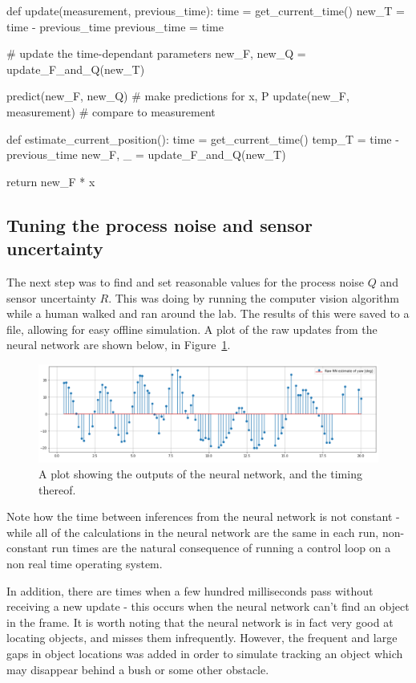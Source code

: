 \begin{python}
def update(measurement, previous_time):
	time = get_current_time()
	new_T = time - previous_time
	previous_time = time
	
	# update the time-dependant parameters
	new_F, new_Q = update_F_and_Q(new_T)
	
	predict(new_F, new_Q) # make predictions for x, P
	update(new_F, measurement) # compare to measurement

def estimate_current_position():
	time = get_current_time()
	temp_T = time - previous_time
	new_F, _ = update_F_and_Q(new_T)
	
	return new_F * x
\end{python}

\subsection{Tuning the process noise and sensor uncertainty}
The next step was to find and set reasonable values for the process noise $Q$ and sensor uncertainty $R$. This was doing by running the computer vision algorithm while a human walked and ran around the lab. The results of this were saved to a file, allowing for easy offline simulation. A plot of the raw updates from the neural network are shown below, in Figure~\ref{fig:raw_nn_results}.

\begin{figure}[h!]
  \centering
  \includegraphics[width=\textwidth]{methodology/raw_nn_results}
  \caption{\label{fig:raw_nn_results} A plot showing the outputs of the neural network, and the timing thereof.}
\end{figure}

Note how the time between inferences from the neural network is not constant - while all of the calculations in the neural network are the same in each run, non-constant run times are the natural consequence of running a control loop on a non real time operating system.

In addition, there are times when a few hundred milliseconds pass without receiving a new update - this occurs when the neural network can't find an object in the frame. It is worth noting that the neural network is in fact very good at locating objects, and misses them infrequently. However, the frequent and large gaps in object locations was added in order to simulate tracking an object which may disappear behind a bush or some other obstacle.

